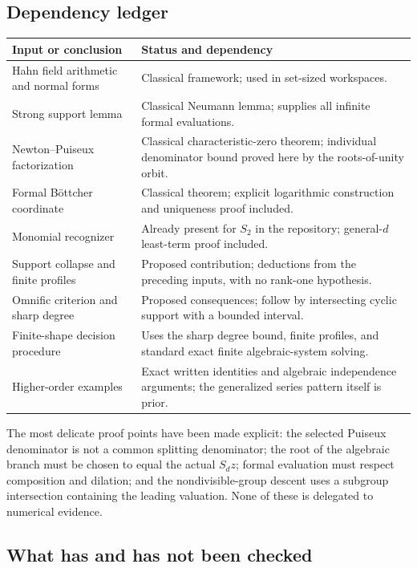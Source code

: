 \documentclass[11pt,letterpaper]{article}
\numberwithin{equation}{section}
\theoremstyle{definition}
\theoremstyle{remark}
\begin{document}
\subsection{Dependency ledger}

\begin{center}
\small
\begin{tabularx}{\textwidth}{@{}p{}Y@{}}
\toprule
Input or conclusion & Status and dependency \\
\midrule
Hahn field arithmetic and normal forms & Classical framework; used in
set-sized workspaces. \\
Strong support lemma & Classical Neumann lemma; supplies all infinite
formal evaluations. \\
Newton--Puiseux factorization & Classical characteristic-zero theorem;
individual denominator bound proved here by the roots-of-unity orbit. \\
Formal B\"ottcher coordinate & Classical theorem; explicit logarithmic
construction and uniqueness proof included. \\
Monomial recognizer & Already present for $S_2$ in the repository;
general-$d$ least-term proof included. \\
Support collapse and finite profiles & Proposed contribution; deductions
from the preceding inputs, with no rank-one hypothesis. \\
Omnific criterion and sharp degree & Proposed consequences; follow by
intersecting cyclic support with a bounded interval. \\
Finite-shape decision procedure & Uses the sharp degree bound, finite
profiles, and standard exact finite algebraic-system solving. \\
Higher-order examples & Exact written identities and algebraic
independence arguments; the generalized series pattern itself is prior. \\
\bottomrule
\end{tabularx}
\end{center}

The most delicate proof points have been made explicit: the selected
Puiseux denominator is not a common splitting denominator; the root
of the algebraic branch must be chosen to equal the actual $S_dz$;
formal evaluation must respect composition and dilation; and the
nondivisible-group descent uses a subgroup intersection containing the
leading valuation. None of these is delegated to numerical evidence.

\subsection{What has and has not been checked}
\end{document}
